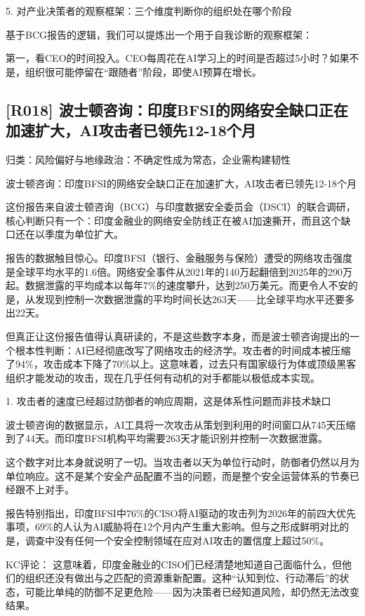 \documentclass[11pt]{ctexart}
\begin{document}
5. 对产业决策者的观察框架：三个维度判断你的组织处在哪个阶段

基于BCG报告的逻辑，我们可以提炼出一个用于自我诊断的观察框架：

第一，看CEO的时间投入。CEO每周花在AI学习上的时间是否超过5小时？如果不是，组织很可能停留在“跟随者”阶段，即使AI预算在增长。

\subsection{[R018] 波士顿咨询：印度BFSI的网络安全缺口正在加速扩大，AI攻击者已领先12-18个月}
{\small\color{refgray}归类：风险偏好与地缘政治：不确定性成为常态，企业需构建韧性}

波士顿咨询：印度BFSI的网络安全缺口正在加速扩大，AI攻击者已领先12-18个月

这份报告来自波士顿咨询（BCG）与印度数据安全委员会（DSCI）的联合调研，核心判断只有一个：印度金融业的网络安全防线正在被AI加速撕开，而且这个缺口还在以季度为单位扩大。

报告的数据触目惊心。印度BFSI（银行、金融服务与保险）遭受的网络攻击强度是全球平均水平的1.6倍。网络安全事件从2021年的140万起翻倍到2025年的290万起。数据泄露的平均成本以每年7\%的速度攀升，达到250万美元。而更令人不安的是，从发现到控制一次数据泄露的平均时间长达263天——比全球平均水平还要多出22天。

但真正让这份报告值得认真研读的，不是这些数字本身，而是波士顿咨询提出的一个根本性判断：AI已经彻底改写了网络攻击的经济学。攻击者的时间成本被压缩了94\%，攻击成本下降了70\%以上。这意味着，过去只有国家级行为体或顶级黑客组织才能发动的攻击，现在几乎任何有动机的对手都能以极低成本实现。

1. 攻击者的速度已经超过防御者的响应周期，这是体系性问题而非技术缺口

波士顿咨询的数据显示，AI工具将一次攻击从策划到利用的时间窗口从745天压缩到了44天。而印度BFSI机构平均需要263天才能识别并控制一次数据泄露。

这个数字对比本身就说明了一切。当攻击者以天为单位行动时，防御者仍然以月为单位响应。这不是某个安全产品配置不当的问题，而是整个安全运营体系的节奏已经跟不上对手。

报告特别指出，印度BFSI中76\%的CISO将AI驱动的攻击列为2026年的前四大优先事项，69\%的人认为AI威胁将在12个月内产生重大影响。但与之形成鲜明对比的是，调查中没有任何一个安全控制领域在应对AI攻击的置信度上超过50\%。

KC评论： 这意味着，印度金融业的CISO们已经清楚地知道自己面临什么，但他们的组织还没有做出与之匹配的资源重新配置。这种“认知到位、行动滞后”的状态，可能比单纯的防御不足更危险——因为决策者已经知道风险，却仍然无法改变结果。
\end{document}
